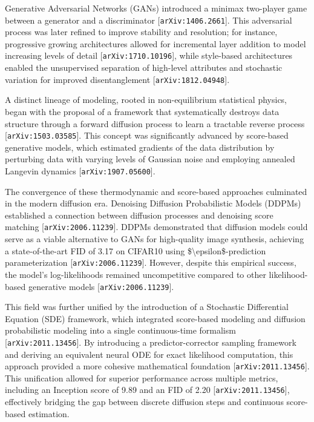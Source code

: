 \documentclass[11pt]{article}
\begin{document}
Generative Adversarial Networks (GANs) introduced a minimax two-player game between a generator and a discriminator [\texttt{arXiv:1406.2661}]. This adversarial process was later refined to improve stability and resolution; for instance, progressive growing architectures allowed for incremental layer addition to model increasing levels of detail [\texttt{arXiv:1710.10196}], while style-based architectures enabled the unsupervised separation of high-level attributes and stochastic variation for improved disentanglement [\texttt{arXiv:1812.04948}].

A distinct lineage of modeling, rooted in non-equilibrium statistical physics, began with the proposal of a framework that systematically destroys data structure through a forward diffusion process to learn a tractable reverse process [\texttt{arXiv:1503.03585}]. This concept was significantly advanced by score-based generative models, which estimated gradients of the data distribution by perturbing data with varying levels of Gaussian noise and employing annealed Langevin dynamics [\texttt{arXiv:1907.05600}].

The convergence of these thermodynamic and score-based approaches culminated in the modern diffusion era. Denoising Diffusion Probabilistic Models (DDPMs) established a connection between diffusion processes and denoising score matching [\texttt{arXiv:2006.11239}]. DDPMs demonstrated that diffusion models could serve as a viable alternative to GANs for high-quality image synthesis, achieving a state-of-the-art FID of 3.17 on CIFAR10 using \$\textbackslash{}epsilon\$-prediction parameterization [\texttt{arXiv:2006.11239}]. However, despite this empirical success, the model's log-likelihoods remained uncompetitive compared to other likelihood-based generative models [\texttt{arXiv:2006.11239}].

This field was further unified by the introduction of a Stochastic Differential Equation (SDE) framework, which integrated score-based modeling and diffusion probabilistic modeling into a single continuous-time formalism [\texttt{arXiv:2011.13456}]. By introducing a predictor-corrector sampling framework and deriving an equivalent neural ODE for exact likelihood computation, this approach provided a more cohesive mathematical foundation [\texttt{arXiv:2011.13456}]. This unification allowed for superior performance across multiple metrics, including an Inception score of 9.89 and an FID of 2.20 [\texttt{arXiv:2011.13456}], effectively bridging the gap between discrete diffusion steps and continuous score-based estimation.
\end{document}
